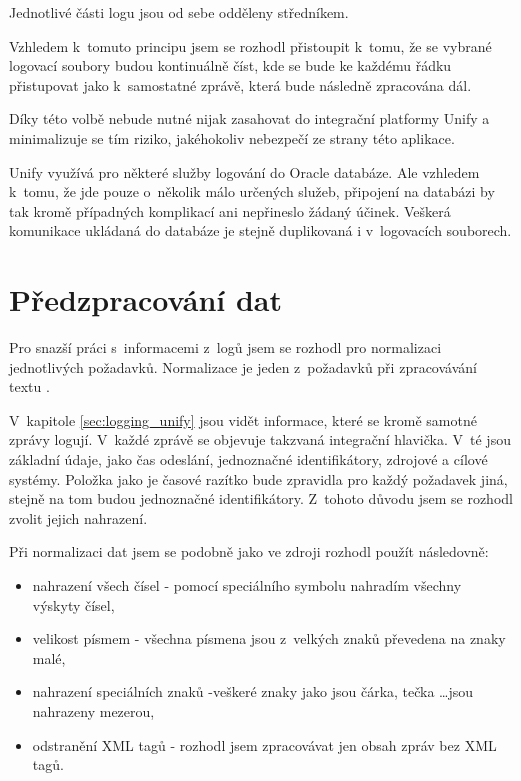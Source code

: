 \documentclass[thesis=M,czech]{FITthesis}[2012/10/20]
\begin{document}
		Jednotlivé části logu jsou od sebe odděleny středníkem.
		
		Vzhledem k~tomuto principu jsem se rozhodl přistoupit k~tomu, že se vybrané logovací soubory budou kontinuálně číst, kde se bude ke každému řádku přistupovat jako k~samostatné zprávě, která bude následně zpracována dál.
		
		Díky této volbě nebude nutné nijak zasahovat do integrační platformy Unify a minimalizuje se tím riziko, jakéhokoliv nebezpečí ze strany této aplikace.
		
		Unify využívá pro některé služby logování do Oracle databáze. Ale vzhledem k~tomu, že jde pouze o~několik málo určených služeb, připojení na databázi by tak kromě případných komplikací ani nepřineslo žádaný účinek. Veškerá komunikace ukládaná do databáze je stejně duplikovaná i v~logovacích souborech.
					
	\section{Předzpracování dat}
		\label{sec:preprocessing}
		
		Pro snazší práci s~informacemi z~logů jsem se rozhodl pro normalizaci jednotlivých požadavků. Normalizace je jeden z~požadavků při zpracovávání textu \cite{txtNrmlztn}.
		
		V~kapitole \ref{sec:logging_unify} jsou vidět informace, které se kromě samotné zprávy logují. V~každé zprávě se objevuje takzvaná integrační hlavička. V~té jsou základní údaje, jako čas odeslání, jednoznačné identifikátory, zdrojové a cílové systémy. Položka jako je časové razítko bude zpravidla pro každý požadavek jiná, stejně na tom budou jednoznačné identifikátory. Z~tohoto důvodu jsem se rozhodl zvolit jejich nahrazení.
		
		Při normalizaci dat jsem se podobně jako ve zdroji \cite{Li_2013} rozhodl použít následovně:
		
		\begin{itemize} 
			\item nahrazení všech čísel - pomocí speciálního symbolu \uv{\#} nahradím všechny výskyty čísel,
			\item velikost písmem - všechna písmena jsou z~velkých znaků převedena na znaky malé,
			\item nahrazení speciálních znaků -veškeré znaky jako jsou čárka, tečka \ldots jsou nahrazeny mezerou,
			\item odstranění XML tagů - rozhodl jsem zpracovávat jen obsah zpráv bez XML tagů.	
		\end{itemize}
	
\end{document}
